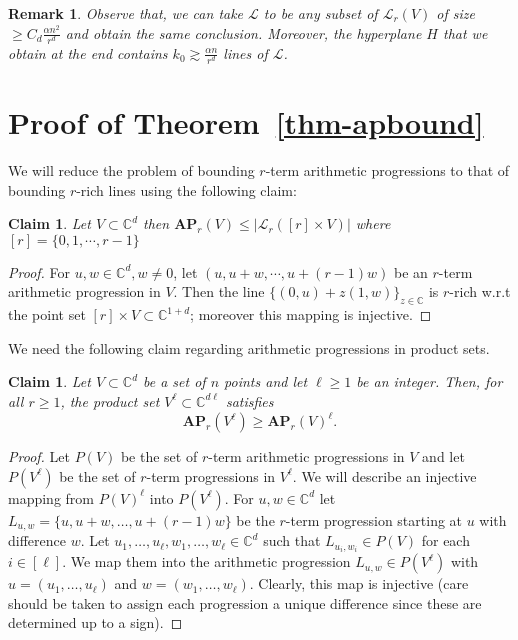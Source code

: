 \documentclass[11pt]{article}
\newtheorem{claim}[thm]{Claim}
\newtheorem{rem}[thm]{Remark}
\def\L{{\mathcal L}}
\def\C{{\mathbb{C}}}
\def\AP{{\mathbf{AP}}}
\begin{document}
\begin{rem}\label{rem-hyperplane_lines}
Observe that, we can take $\L$ to be any subset of $\L_r(V)$ of size $\ge C_d \frac{\alpha n^2}{r^d}$ and obtain the same conclusion. Moreover, the hyperplane $H$ that we obtain at the end contains $k_0\gtrsim \frac{\alpha n}{r^{d}}$ lines of $\L$.
\end{rem}
\section{Proof of Theorem~\ref{thm-apbound}}\label{sec-apbound}
We will reduce the problem of bounding $r$-term arithmetic progressions to that of bounding $r$-rich lines using the following claim:
\begin{claim}\label{cla-ap_to_richline}
Let $V\subset \C^d$ then $\AP_r(V)\le |\L_r([r] \times V)|$ where $[r]=\{0,1,\cdots,r-1\}$
\end{claim}
\begin{proof}
For $u,w\in \C^d, w\ne 0$, let $(u,u+w,\cdots,u+(r-1)w)$ be an $r$-term arithmetic progression in $V$. Then the line $\{(0,u)+z(1,w)\}_{z\in \C}$ is $r$-rich w.r.t the point set $[r]\times V \subset \C^{1+d}$; moreover this mapping is injective.
\end{proof}
We need the following claim regarding arithmetic progressions in product sets.
\begin{claim}\label{cla-aptensor}
Let $V \subset \C^d$ be a set of $n$ points and let $\ell \geq 1$ be an integer. Then, for all $r \geq 1$, the product set $V^\ell \subset \C^{d\ell}$ satisfies $$ \AP_r(V^\ell) \geq \AP_r(V)^\ell.$$
\end{claim}
\begin{proof}
Let $P(V)$ be the set of $r$-term arithmetic progressions in $V$ and let $P(V^\ell)$ be the set of $r$-term progressions in $V^\ell$. We will describe an injective mapping from $P(V)^\ell$ into $P(V^\ell)$. For $u,w \in \C^d$ let $L_{u,w} = \{u,u+w,\ldots,u+(r-1)w\}$ be the $r$-term progression starting at $u$ with difference $w$. Let $u_1,\ldots,u_\ell,w_1,\ldots,w_\ell \in \C^d$ such that $L_{u_i,w_i} \in P(V)$ for each $i \in [\ell]$. We map them into the arithmetic progression $L_{u,w} \in P(V^\ell)$ with $u = (u_1,\ldots,u_\ell)$ and $w = (w_1,\ldots,w_\ell)$. Clearly, this map is injective (care should be taken to assign each progression a unique difference since these are determined up to a sign).
\end{proof}
\end{document}

